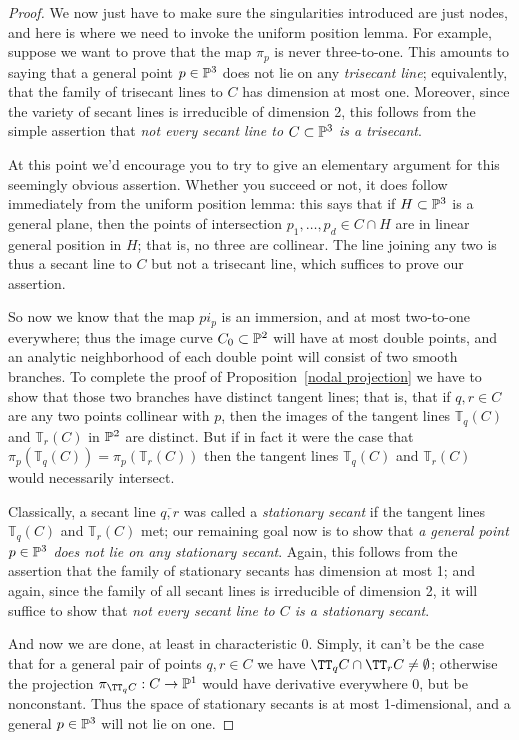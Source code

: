 \begin{proof}
We now just have to make sure the singularities introduced are just nodes, and here is where we need to invoke the uniform position lemma. For example, suppose we want to prove that the map $\pi_p$ is never three-to-one. This amounts to saying that a general point $p \in \PP^3$ does not lie on any \emph{trisecant line}; equivalently, that the family of trisecant lines to $C$ has dimension at most one. Moreover, since the variety of secant lines is irreducible of dimension 2, this follows from the simple assertion that \emph{not every secant line to $C \subset \PP^3$ is a trisecant}.

At this point we'd encourage you to try to give an elementary argument for this seemingly obvious assertion. Whether you succeed or not, it does follow immediately from the uniform position lemma: this says that if $H \subset \PP^3$ is a general plane, then the points of intersection $p_1,\dots,p_d \in C \cap H$ are in linear general position in $H$; that is, no three are collinear. The line joining any two is thus a secant line to $C$ but not a trisecant line, which suffices to prove our assertion.

So now we know that the map $pi_p$ is an immersion, and at most two-to-one everywhere; thus the image curve $C_0 \subset \PP^2$ will have at most double points, and an analytic neighborhood of each double point will consist of two smooth branches.
To complete the proof of Proposition~\ref{nodal projection} we have to show that those two branches have distinct tangent lines; that is, that
if $q, r \in C$ are any two points collinear with $p$, then the images of the tangent lines ${\mathbb T}_q(C)$ and ${\mathbb T}_r(C)$ in $\PP^2$ are distinct. But if in fact it were the case that  $\pi_p({\mathbb T}_q(C)) = \pi_p({\mathbb T}_r(C))$ then the tangent lines ${\mathbb T}_q(C)$ and ${\mathbb T}_r(C)$ would necessarily intersect.

Classically, a secant line $\overline{q,r}$ was called a \emph{stationary secant} if the tangent lines ${\mathbb T}_q(C)$ and ${\mathbb T}_r(C)$ met; our remaining goal now is to show that \emph{a general point $p \in \PP^3$ does not lie on any stationary secant}. Again, this follows from the assertion that the family of stationary secants has dimension at most 1; and again, since the family of all secant lines is irreducible of dimension 2, it will suffice to show that \emph{not every secant line to $C$ is a stationary secant}.

And now we are done, at least in characteristic 0. Simply, it can't be the case that for a general pair of points $q, r \in C$ we have $\TT_qC \cap \TT_rC \neq \emptyset$; otherwise the projection $\pi_{\TT_qC} : C \to \PP^1$ would have derivative everywhere 0, but be nonconstant. Thus the space of  stationary secants is at most 1-dimensional, and a general $p \in \PP^3$ will not lie on one.
\end{proof}

